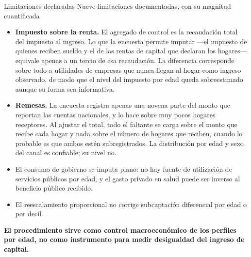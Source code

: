 \documentclass[aspectratio=169,11pt]{beamer}
\newcommand{\bajada}[1]{{\small\textcolor{gris}{#1}}\vspace{0.5em}}
\newcommand{\cierre}[1]{%
  \vfill{\small\textcolor{acento}{\textbf{#1}}}}
\begin{document}
\begin{frame}{Limitaciones declaradas}
\bajada{Nueve limitaciones documentadas, con su magnitud cuantificada}

\begin{itemize}\small\itemsep0.45em
  \item \textbf{Impuesto sobre la renta.} El agregado de control es la recaudación total del
        impuesto al ingreso. Lo que la encuesta permite imputar ---el impuesto de quienes reciben
        sueldo y el de las rentas de capital que declaran los hogares--- equivale apenas a un
        tercio de esa recaudación. La diferencia corresponde sobre todo a utilidades de empresas
        que nunca llegan al hogar como ingreso observado, de modo que el nivel del impuesto por
        edad queda sobreestimado aunque su forma sea informativa.
  \item \textbf{Remesas.} La encuesta registra apenas una novena parte del monto que reportan las
        cuentas nacionales, y lo hace sobre muy pocos hogares receptores. Al ajustar el total, todo
        el faltante se carga sobre el monto que recibe cada hogar y nada sobre el número de hogares
        que reciben, cuando lo probable es que ambos estén subregistrados. La distribución por edad
        y sexo del canal es confiable; su nivel no.
  \item El consumo de gobierno se imputa plano: no hay fuente de utilización de servicios públicos
        por edad, y el gasto privado en salud puede ser inverso al beneficio público recibido.
  \item El reescalamiento proporcional no corrige subcaptación diferencial por edad o por decil.
\end{itemize}

\cierre{El procedimiento sirve como control macroeconómico de los perfiles por edad, no como
instrumento para medir desigualdad del ingreso de capital.}
\end{frame}
\end{document}
